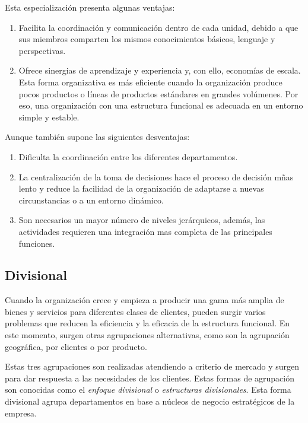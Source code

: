 \documentclass[12pt,a4paper,spanish]{report}
\begin{document}
			Esta especialización presenta algunas ventajas:
			\begin{enumerate}
				\item Facilita la coordinación y comunicación dentro de cada unidad, debido a que sus miembros comparten los mismos conocimientos básicos, lenguaje y perspectivas.

				\item Ofrece sinergias de aprendizaje y experiencia y, con ello, economías de escala. Esta forma organizativa es más eficiente cuando la organización produce pocos productos o líneas de productos estándares en grandes volúmenes. Por eso, una organización con una estructura funcional es adecuada en un entorno simple y estable.
			\end{enumerate}
			Aunque también supone las siguientes desventajas:
			\begin{enumerate}
				\item Dificulta la coordinación entre los diferentes departamentos.
				\item La centralización de la toma de decisiones hace el proceso de decisión mñas lento y reduce la facilidad de la organización de adaptarse a nuevas circunstancias o a un entorno dinámico.
				\item Son necesarios un mayor número de niveles jerárquicos, además, las actividades requieren una integración mas completa de las principales funciones.
			\end{enumerate}

		\subsection{\textcolor[rgb]{0.5,0.1,0.4}Divisional}
			Cuando la organización crece y empieza a producir una gama más amplia de bienes y servicios para diferentes clases de clientes, pueden surgir varios problemas que reducen la eficiencia y la eficacia de la estructura funcional. En este momento, surgen otras agrupaciones alternativas, como son la agrupación geográfica, por clientes o por producto.

			Estas tres agrupaciones son realizadas atendiendo a criterio de mercado y surgen para dar respuesta a las necesidades de los clientes. Estas formas de agrupación son conocidas como el \textcolor[rgb]{0.5,0.1,0.4}{\emph{enfoque divisional}} o \textcolor[rgb]{0.5,0.1,0.4}{\emph{estructuras divisionales}}. Esta forma divisional agrupa departamentos en base a núcleos de negocio estratégicos de la empresa.
\end{document}
